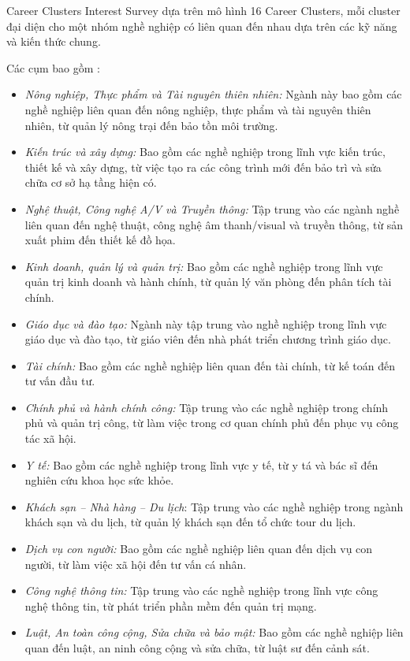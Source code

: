 Career Clusters Interest Survey dựa trên mô hình 16 Career Clusters, mỗi cluster đại diện cho một nhóm nghề nghiệp có liên quan đến nhau dựa trên các kỹ năng và kiến thức chung. 

Các cụm bao gồm :
\begin{itemize}
    \item \textit{Nông nghiệp, Thực phẩm và Tài nguyên thiên nhiên:} Ngành này bao gồm các nghề nghiệp liên quan đến nông nghiệp, thực phẩm và tài nguyên thiên nhiên, từ quản lý nông trại đến bảo tồn môi trường.
    \item \textit{Kiến trúc và xây dựng:} Bao gồm các nghề nghiệp trong lĩnh vực kiến trúc, thiết kế và xây dựng, từ việc tạo ra các công trình mới đến bảo trì và sửa chữa cơ sở hạ tầng hiện có.
    \item \textit{Nghệ thuật, Công nghệ A/V và Truyền thông:} Tập trung vào các ngành nghề liên quan đến nghệ thuật, công nghệ âm thanh/visual và truyền thông, từ sản xuất phim đến thiết kế đồ họa.
    \item \textit{Kinh doanh, quản lý và quản trị:} Bao gồm các nghề nghiệp trong lĩnh vực quản trị kinh doanh và hành chính, từ quản lý văn phòng đến phân tích tài chính.
    \item \textit{Giáo dục và đào tạo:} Ngành này tập trung vào nghề nghiệp trong lĩnh vực giáo dục và đào tạo, từ giáo viên đến nhà phát triển chương trình giáo dục.
    \item \textit{Tài chính:} Bao gồm các nghề nghiệp liên quan đến tài chính, từ kế toán đến tư vấn đầu tư.
    \item \textit{Chính phủ và hành chính công:} Tập trung vào các nghề nghiệp trong chính phủ và quản trị công, từ làm việc trong cơ quan chính phủ đến phục vụ công tác xã hội.
    \item \textit{Y tế:} Bao gồm các nghề nghiệp trong lĩnh vực y tế, từ y tá và bác sĩ đến nghiên cứu khoa học sức khỏe.
    \item \textit{Khách sạn – Nhà hàng – Du lịch}: Tập trung vào các nghề nghiệp trong ngành khách sạn và du lịch, từ quản lý khách sạn đến tổ chức tour du lịch.
    \item \textit{Dịch vụ con người:} Bao gồm các nghề nghiệp liên quan đến dịch vụ con người, từ làm việc xã hội đến tư vấn cá nhân.
    \item \textit{Công nghệ thông tin:} Tập trung vào các nghề nghiệp trong lĩnh vực công nghệ thông tin, từ phát triển phần mềm đến quản trị mạng.
    \item \textit{Luật, An toàn công cộng, Sửa chữa và bảo mật:} Bao gồm các nghề nghiệp liên quan đến luật, an ninh công cộng và sửa chữa, từ luật sư đến cảnh sát.

\end{itemize}
